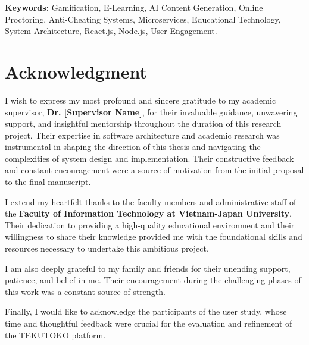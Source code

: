 \vspace{1cm}
\noindent\textbf{Keywords:} Gamification, E-Learning, AI Content Generation, Online Proctoring, Anti-Cheating Systems, Microservices, Educational Technology, System Architecture, React.js, Node.js, User Engagement.

\cleardoublepage

\chapter*{Acknowledgment}
I wish to express my most profound and sincere gratitude to my academic supervisor, \textbf{Dr. [Supervisor Name]}, for their invaluable guidance, unwavering support, and insightful mentorship throughout the duration of this research project. Their expertise in software architecture and academic research was instrumental in shaping the direction of this thesis and navigating the complexities of system design and implementation. Their constructive feedback and constant encouragement were a source of motivation from the initial proposal to the final manuscript.

I extend my heartfelt thanks to the faculty members and administrative staff of the \textbf{Faculty of Information Technology at Vietnam-Japan University}. Their dedication to providing a high-quality educational environment and their willingness to share their knowledge provided me with the foundational skills and resources necessary to undertake this ambitious project.

I am also deeply grateful to my family and friends for their unending support, patience, and belief in me. Their encouragement during the challenging phases of this work was a constant source of strength.

Finally, I would like to acknowledge the participants of the user study, whose time and thoughtful feedback were crucial for the evaluation and refinement of the TEKUTOKO platform.